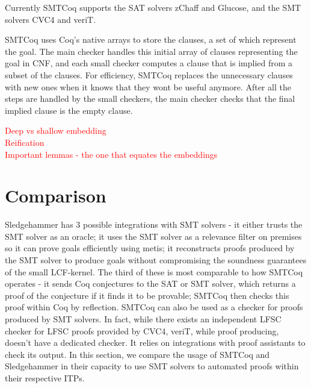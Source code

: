\documentclass{article}
\begin{document}
	Currently SMTCoq supports the SAT solvers zChaff and Glucose, 
	and the SMT solvers CVC4 and veriT. 
	
	SMTCoq uses Coq's native arrays to store the clauses, 
	a set of which represent the goal. The main checker 
	handles this initial array of clauses representing the 
	goal in CNF, and each small checker computes a 
	clause that is implied from a subset of the clauses.
	For efficiency, SMTCoq replaces the unnecessary 
	clauses with new ones when it knows that they 
	wont be useful anymore. After all the steps 
	are handled by the small checkers, the main 
	checker checks that the final implied clause is 
	the empty clause.
	
	\textcolor{red}{Deep vs shallow embedding}\\
	\textcolor{red}{Reification}\\
	\textcolor{red}{Important lemmas - the one that equates the embeddings}\\
	
\section{Comparison}
\label{sec:comp}
	Sledgehammer has 3 possible integrations with SMT solvers - 
	it either trusts the SMT solver as an oracle; it uses the 
	SMT solver as a relevance filter on premises so it can 
	prove goals efficiently using metis; it reconstructs 
	proofs produced by the SMT solver to produce goals 
	without compromising the soundness guarantees of the 
	small LCF-kernel. The third of these is most comparable 
	to how SMTCoq operates - it sends Coq conjectures to the 
	SAT or SMT solver, which returns a proof of the conjecture 
	if it finds it to be provable; SMTCoq then checks this 
	proof within Coq by reflection. SMTCoq can also be used as a 
	checker for proofs produced by SMT solvers. In fact, while 
	there exists an independent LFSC checker for LFSC proofs 
	provided by CVC4, veriT, while proof producing, doesn't 
	have a dedicated checker. It relies on integrations with 
	proof assistants to check its output. In this section, we 
	compare the usage of SMTCoq and Sledgehammer in their 
	capacity to use SMT solvers to automated proofs within 
	their respective ITPs.
	
\end{document}
